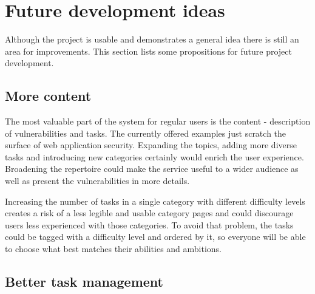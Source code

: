 \section{Future development ideas}

Although the project is usable and demonstrates a general idea there is still an area for improvements. This section lists some propositions for future project development.

\subsection{More content}

The most valuable part of the system for regular users is the content - description of vulnerabilities and tasks. The currently offered examples just scratch the surface of web application security. Expanding the topics, adding more diverse tasks and introducing new categories certainly would enrich the user experience. Broadening the repertoire could make the service useful to a wider audience as well as present the vulnerabilities in more details.

Increasing the number of tasks in a single category with different difficulty levels creates a risk of a less legible and usable category pages and could discourage users less experienced with those categories. To avoid that problem, the tasks could be tagged with a difficulty level and ordered by it, so everyone will be able to choose what best matches their abilities and ambitions.

\subsection{Better task management}

